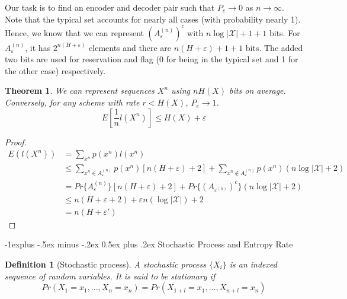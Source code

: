 \documentclass[10pt,landscape, a4paper]{article}
\makeatletter
\newtheorem{definition}{Definition}
\newtheorem{theorem}{Theorem}
\renewcommand{\subsection}{\@startsection{subsection}{2}{0mm}%
                                {-1explus -.5ex minus -.2ex}%
                                {0.5ex plus .2ex}%
                                {\normalfont\normalsize\bfseries}}
\makeatother
\begin{document}
\begin{multicols}{3}
Our task is to find an encoder and decoder pair such that $P_e\rightarrow 0$ as $n\rightarrow \infty$. Note that the typical set accounts for nearly all cases (with probability nearly 1). Hence, we know that we can represent $(A_\varepsilon^{(n)})^c$ with $n\log |\mathcal{X}|+1+1$ bits. For $A_{\varepsilon}^{(n)}$, it has $2^{n(H+\varepsilon)}$ elements and there are $n(H+\varepsilon)+1+1$ bits. The added two bits are used for reservation and flag (0 for being in the typical set and 1 for the other case) respectively.
\begin{theorem}
    We can represent sequences $X^n$ using $nH(X)$ bits on average. Conversely, for any scheme with rate $r<H(X)$, $P_e\rightarrow 1$. 
    $$
    E\left[\frac{1}{n}l(X^n)\right]\le H(X)+\varepsilon
    $$
\end{theorem}
\begin{proof}
    $$
    \begin{aligned}
        E(l(X^n))&=\sum_{x^n}p(x^n)l(x^n)\\
        &\le\sum_{x^n\in A_{\varepsilon}^{(n)}}p(x^n)[n(H+\varepsilon)+2]+\sum_{x^n\notin A_{\varepsilon}^{(n)}} p(x^n)(n\log |\mathcal{X}|+2)\\
        &=Pr\{A_{\varepsilon}^{(n)}\}[n(H+\varepsilon)+2]+Pr\{(A_{\varepsilon^{(n)}})^c\}(n\log|\mathcal{X}|+2)\\
        &\le n(H+\varepsilon+2)+\varepsilon n(\log |\mathcal{X}|)+2\\
        &=n(H+\varepsilon')
        \end{aligned}
    $$
\end{proof}
\subsection{Stochastic Process and Entropy Rate}
\begin{definition}[Stochastic process]
    A stochastic process $\{X_i\}$ is an indexed sequence of random variables. It is said to be stationary if
    $$
    Pr(X_1=x_1,\dots, X_n=x_n)=Pr(X_{1+l}=x_1, \dots, X_{n+l}=x_n)
    $$
\end{definition}


\end{multicols}
\end{document}
